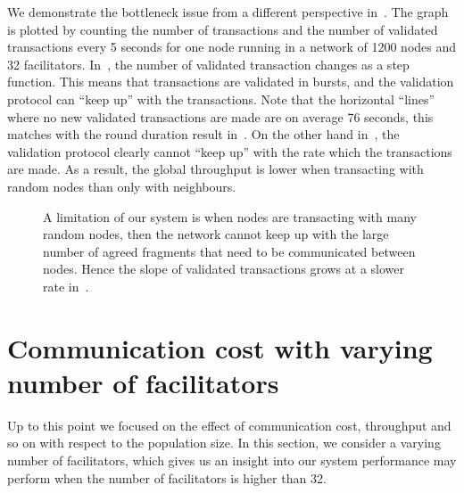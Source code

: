 We demonstrate the bottleneck issue from a different perspective in~.
The graph is plotted by counting the number of transactions and the number of validated transactions every 5 seconds for one node running in a network of 1200 nodes and 32 facilitators.
In~, the number of validated transaction changes as a step function.
This means that transactions are validated in bursts, and the validation protocol can ``keep up'' with the transactions.
Note that the horizontal ``lines'' where no new validated transactions are made are on average 76 seconds, this matches with the round duration result in~.
On the other hand in~, the validation protocol clearly cannot ``keep up'' with the rate which the transactions are made.
As a result, the global throughput is lower when transacting with random nodes than only with neighbours.

\begin{figure}[tb]
  \centering
  \caption{A limitation of our system is when nodes are transacting with many random nodes,
  then the network cannot keep up with the large number of agreed fragments that need to be communicated between nodes.
  Hence the slope of validated transactions grows at a slower rate in~.}
  \label{fig:backlog}
\end{figure}

\section{Communication cost with varying number of facilitators}
Up to this point we focused on the effect of communication cost, throughput and so on with respect to the population size.
In this section, we consider a varying number of facilitators,
which gives us an insight into our system performance may perform when the number of facilitators is higher than 32.

